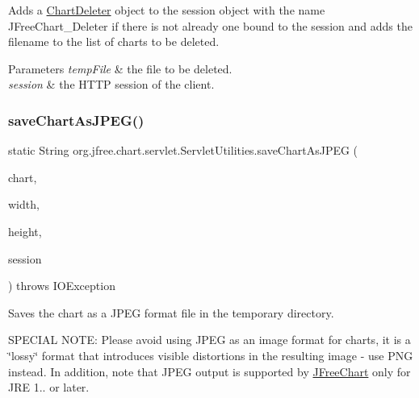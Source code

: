 Adds a \mbox{\hyperlink{classorg_1_1jfree_1_1chart_1_1servlet_1_1_chart_deleter}{Chart\+Deleter}} object to the session object with the name {\ttfamily J\+Free\+Chart\+\_\+\+Deleter} if there is not already one bound to the session and adds the filename to the list of charts to be deleted.


\begin{DoxyParams}{Parameters}
{\em temp\+File} & the file to be deleted. \\
\hline
{\em session} & the H\+T\+TP session of the client. \\
\hline
\end{DoxyParams}
\mbox{\label{classorg_1_1jfree_1_1chart_1_1servlet_1_1_servlet_utilities_a57e551f538c4e9227cba5c7e487a8e58}} 
\subsubsection{\texorpdfstring{save\+Chart\+As\+J\+P\+E\+G()}{saveChartAsJPEG()}\hspace{0.1cm}{\footnotesize\ttfamily [1/2]}}
{\footnotesize\ttfamily static String org.\+jfree.\+chart.\+servlet.\+Servlet\+Utilities.\+save\+Chart\+As\+J\+P\+EG (\begin{DoxyParamCaption}\item[{\mbox{\hyperlink{classorg_1_1jfree_1_1chart_1_1_j_free_chart}{J\+Free\+Chart}}}]{chart,  }\item[{int}]{width,  }\item[{int}]{height,  }\item[{Http\+Session}]{session }\end{DoxyParamCaption}) throws I\+O\+Exception\hspace{0.3cm}{\ttfamily [static]}}

Saves the chart as a J\+P\+EG format file in the temporary directory. 

S\+P\+E\+C\+I\+AL N\+O\+TE\+: Please avoid using J\+P\+EG as an image format for charts, it is a \char`\"{}lossy\char`\"{} format that introduces visible distortions in the resulting image -\/ use P\+NG instead. In addition, note that J\+P\+EG output is supported by \mbox{\hyperlink{classorg_1_1jfree_1_1chart_1_1_j_free_chart}{J\+Free\+Chart}} only for J\+RE 1.. or later.


